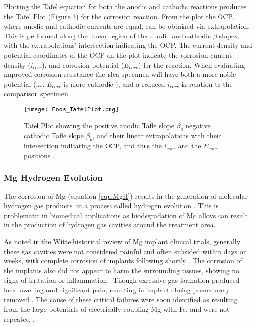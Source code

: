\documentclass[draft,a4paper,12pt,oneside]{report}%
\begin{document}
Plotting the Tafel equation for both the anodic and cathodic reactions produces the Tafel Plot (Figure \ref{fig:EnosTafel}) for the corrosion reaction. From the plot the OCP, where anodic and cathodic currents are equal, can be obtained via extrapolation. This is performed along the linear region of the anodic and cathodic $\beta$ slopes, with the extrapolations' intersection indicating the OCP. The current density and potential coordinates of the OCP on the plot indicate the corrosion current density ($i_{corr}$), and corrosion potential ($E_{corr}$) for the reaction. When evaluating improved corrosion resistance the idea specimen will have both a more noble potential (i.e. $E_{corr}$ is more cathodic ), and a reduced $i_{corr}$ in relation to the comparison specimen.

\begin{figure}[htbp]
	\centering
	\texttt{[image: Enos\_TafelPlot.png]}
	\caption[Tafel Plot]{Tafel Plot showing the positive anodic Tafle slope $\beta_{a}$ negative cathodic Tafle slope $\beta_{b}$, and their linear extrapolations with their intersection indicating the OCP, and thus the $i_{corr}$ and the $E_{corr}$ positions \cite{Enos1997}.}
	\label{fig:EnosTafel}
\end{figure}

\subsubsection{Mg Hydrogen Evolution}
The corrosion of Mg (equation \ref{equ:MgH}) results in the generation of molecular hydrogen gas products, in a process called hydrogen evolution \cite{Zberg2009}. This is problematic in biomedical applications as biodegradation of Mg alloys can result in the production of hydrogen gas cavities around the treatment area. 

As noted in the Witte \cite{Witte2010} historical review of Mg implant clinical trials, generally these gas cavities were not considered painful and often subsided within days or weeks, with complete corrosion of implants following shortly \cite{Verbrugge1933, Lambotte1932}. The corrosion of the implants also did not appear to harm the surrounding tissues, showing no signs of irritation or inflammation \cite{Verbrugge1933}. Though excessive gas formation produced local swelling and significant pain, resulting in implants being prematurely removed \cite{Lambotte1932}. The cause of these critical failures were soon identified as resulting from the large potentials of electrically coupling Mg with Fe, and were not repeated \cite{Lambotte1932}. 
\end{document}
